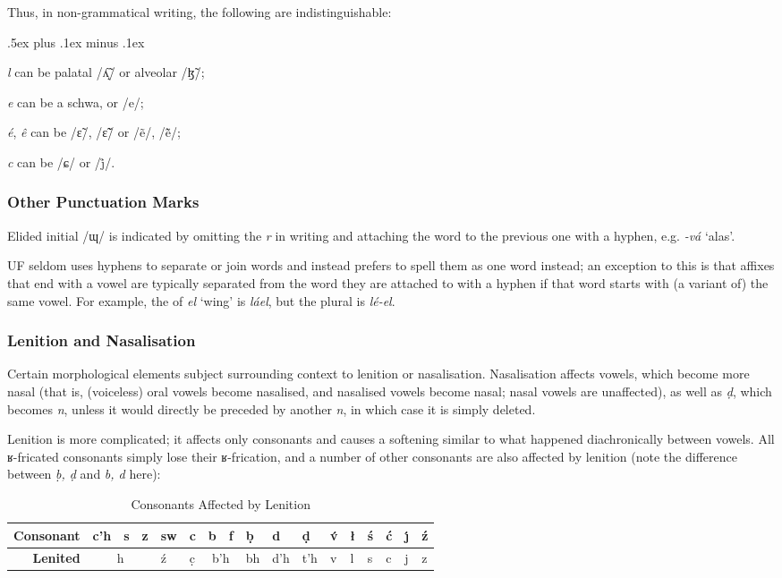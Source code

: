 \documentclass[a4paper, 12pt, twoside, final]{article}
\let \nf \normalfont
\let \w \textit
\begin{document}
\noindent Thus, in non-grammatical writing, the following are indistinguishable:
\begin{items}\itemsep .5ex plus .1ex minus .1ex\relax
\item \w{l} can be palatal /ʎ̝̃/ or alveolar /ɮ̃/;
\item \w{e} can be a schwa, or /e/;
\item \w{é}, \w{ê} can be /ɛ̃/, /ɛ̃̃/ or /ẽ/, /ẽ̃/;
\item \w{c} can be /ɕ/ or /j̊/.
\end{items}

\subsubsection{Other Punctuation Marks}
\noindent Elided initial /ɰ/ is indicated by omitting the \w{r} in writing and attaching the word to the previous one with a hyphen,
e.g. \w{-vá} ‘alas’.

UF seldom uses hyphens to separate or join words and instead prefers to spell them as one word instead; an exception
to this is that affixes that end with a vowel are typically separated from the word they are attached to with a hyphen
if that word starts with (a variant of) the same vowel. For example, the  of \w{el} ‘wing’
is \w{láel}, but the plural is \w{lé-el}.

\subsubsection{Lenition and Nasalisation}
Certain morphological elements subject surrounding context to lenition or nasalisation. Nasalisation affects vowels,
which become more nasal (that is, (voiceless) oral vowels become nasalised, and nasalised vowels become nasal; nasal
vowels are unaffected), as well as \w{ḍ}, which becomes \w{n}, unless it would directly be preceded by another \w{n}, in
which case it is simply deleted.

Lenition is more complicated; it affects only consonants and causes a softening similar to what happened diachronically
between vowels. All ʁ-fricated consonants simply lose their ʁ-frication, and a number of other consonants are also
affected by lenition (note the difference between \w{ḅ, ḍ} and \w{b, d} here):

\begin{table}[H]
\centering
\itshape
\begin{tabular}{r|lll|l|l|ll|l|l|l|l|l|l|l|l|l}
\bf Consonant & c’h & s & z & sw     & c & b & f                        & ḅ   & d   & ḍ   & v́ & ł & ś & ć & ȷ́ & ź  \\\hline
\bf Lenited & \multicolumn{3}{c|}{h} & ź & c̣ & \multicolumn{2}{c|}{b’h} & bh  & d’h & t’h & v & l & s & c & j & z \\
\end{tabular}
\nf
\caption{Consonants Affected by Lenition}\label{tab:lenition}
\end{table}
\end{document}
